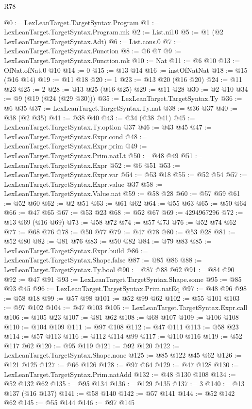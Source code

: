 \begin{lexlean}{R78}
\begin{coremodule}
@0 := LexLeanTarget.TargetSyntax.Program
@1 := LexLeanTarget.TargetSyntax.Program.mk
@2 := List.nil.{0}
@5 := @1 (@2 LexLeanTarget.TargetSyntax.Adt)
@6 := List.cons.{0}
@7 := LexLeanTarget.TargetSyntax.Function
@8 := @6 @7
@9 := LexLeanTarget.TargetSyntax.Function.mk
@10 := Nat
@11 := @6 @10
@13 := OfNat.ofNat.{0} @10
@14 := 0
@15 := @13 @14
@16 := instOfNatNat
@18 := @15 (@16 @14)
@19 := @11 @18
@20 := 1
@23 := @13 @20 (@16 @20)
@24 := @11 @23
@25 := 2
@28 := @13 @25 (@16 @25)
@29 := @11 @28
@30 := @2 @10
@34 := @9 (@19 (@24 (@29 @30)))
@35 := LexLeanTarget.TargetSyntax.Ty
@36 := @6 @35
@37 := LexLeanTarget.TargetSyntax.Ty.nat
@38 := @36 @37
@40 := @38 (@2 @35)
@41 := @38 @40
@43 := @34 (@38 @41)
@45 := LexLeanTarget.TargetSyntax.Ty.option @37
@46 := @43 @45
@47 := LexLeanTarget.TargetSyntax.Expr.cond
@48 := LexLeanTarget.TargetSyntax.Expr.prim
@49 := LexLeanTarget.TargetSyntax.Prim.natLt
@50 := @48 @49
@51 := LexLeanTarget.TargetSyntax.Expr
@52 := @6 @51
@53 := LexLeanTarget.TargetSyntax.Expr.var
@54 := @53 @18
@55 := @52 @54
@57 := LexLeanTarget.TargetSyntax.Expr.value @37
@58 := LexLeanTarget.TargetSyntax.Value.nat
@59 := @58 @28
@60 := @57 @59
@61 := @52 @60
@62 := @2 @51
@63 := @61 @62
@64 := @55 @63
@65 := @50 @64
@66 := @47 @65
@67 := @53 @23
@68 := @52 @67
@69 := 4294967296
@72 := @13 @69 (@16 @69)
@73 := @58 @72
@74 := @57 @73
@76 := @52 @74 @62
@77 := @68 @76
@78 := @50 @77
@79 := @47 @78
@80 := @53 @28
@81 := @52 @80
@82 := @81 @76
@83 := @50 @82
@84 := @79 @83
@85 := LexLeanTarget.TargetSyntax.Expr.build
@86 := LexLeanTarget.TargetSyntax.Shape.false
@87 := @85 @86
@88 := LexLeanTarget.TargetSyntax.Ty.bool
@90 := @87 @88 @62
@91 := @84 @90
@92 := @47 @91
@93 := LexLeanTarget.TargetSyntax.Shape.some
@95 := @85 @93 @45
@96 := LexLeanTarget.TargetSyntax.Prim.natEq
@97 := @48 @96
@98 := @58 @18
@99 := @57 @98
@101 := @52 @99 @62
@102 := @55 @101
@103 := @97 @102
@104 := @47 @103
@105 := LexLeanTarget.TargetSyntax.Expr.call
@106 := @105 @23
@107 := @81 @62
@108 := @68 @107
@109 := @106 @108
@110 := @104 @109
@111 := @97 @108
@112 := @47 @111
@113 := @58 @23
@114 := @57 @113
@116 := @112 @114 @99
@117 := @110 @116
@119 := @52 @117 @62
@120 := @95 @119
@121 := @92 @120
@122 := LexLeanTarget.TargetSyntax.Shape.none
@125 := @85 @122 @45 @62
@126 := @121 @125
@127 := @66 @126
@128 := @97 @64
@129 := @47 @128
@130 := LexLeanTarget.TargetSyntax.Prim.natAdd
@132 := @48 @130 @108
@134 := @52 @132 @62
@135 := @95 @134
@136 := @129 @135
@137 := 3
@140 := @13 @137 (@16 @137)
@141 := @58 @140
@142 := @57 @141
@144 := @52 @142 @62
@145 := @55 @144
@146 := @97 @145

\end{coremodule}
\end{lexlean}
